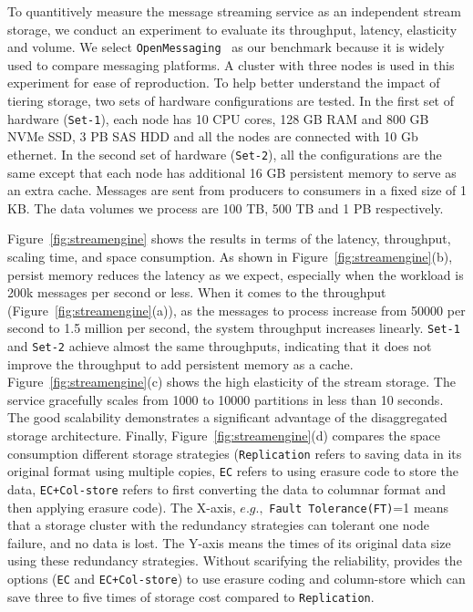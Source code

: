 To quantitively measure the message streaming service as an independent stream storage, we conduct an experiment to evaluate its throughput, latency, elasticity and volume. We select \texttt{OpenMessaging}~\cite{} as our benchmark  because it is widely used to compare messaging platforms. A cluster with three nodes is used in this experiment for  ease of reproduction.
 To help better understand the impact of tiering storage, two sets of hardware configurations are tested. In the first set of hardware (\texttt{Set-1}), each node has 10 CPU cores, 128 GB RAM and 800 GB NVMe SSD, 3 PB SAS HDD and all the nodes are connected with 10 Gb ethernet. In the second set of hardware (\texttt{Set-2}), all the configurations are the same except that each node has additional 16 GB persistent memory to serve as an extra cache. Messages are sent from producers to consumers in a fixed size of 1 KB. The data volumes we process are 100 TB, 500 TB and 1 PB respectively. 


Figure~\ref{fig:streamengine} shows the results in terms of  the latency, throughput, scaling time, and space consumption.
As shown in Figure~\ref{fig:streamengine}(b), persist memory reduces the latency as we expect, especially when the workload is 200k messages per second or less.
When it comes to the throughput (Figure~\ref{fig:streamengine}(a)), as the messages to process increase from 50000 per second to 1.5 million per second, the system throughput increases linearly. 
\texttt{Set-1} and \texttt{Set-2} achieve almost the same throughputs, indicating that it does not improve the throughput to add persistent memory as a cache. 
 Figure~\ref{fig:streamengine}(c) shows the high elasticity of the stream storage. The service gracefully scales from 1000 to 10000 partitions in less than 10 seconds. The good scalability  demonstrates a significant advantage of the   disaggregated storage architecture. 
Finally, Figure~\ref{fig:streamengine}(d) compares the space consumption different storage strategies (\texttt{Replication} refers to  saving data in its original format using multiple copies, \texttt{EC} refers to using erasure code to store the data, \texttt{EC+Col-store} refers to first converting the data to columnar format and then applying erasure code). 
The X-axis, $e.g.,$ \texttt{Fault Tolerance(FT)}=1 means that a storage cluster with the redundancy strategies can tolerant one node failure, and no data is lost.
The  Y-axis means  the times of its original data size   using these redundancy strategies.
 Without scarifying the reliability, \sys provides the options (\texttt{EC} and \texttt{EC+Col-store}) to use erasure coding and column-store which can save three to five times of storage cost compared to \texttt{Replication}. 






